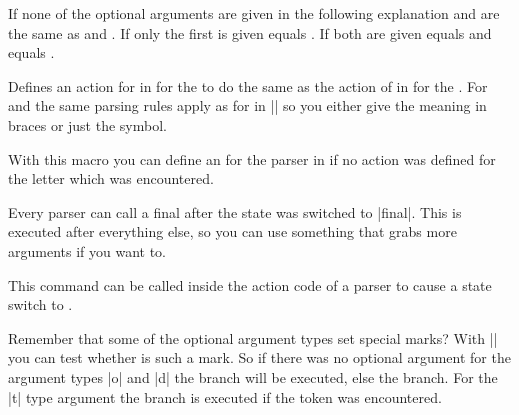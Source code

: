 \begin{command}%
  {%
    \pgfparserlet
  }%
  If none of the optional arguments are given in the following explanation
   and  are the same as
   and . If only the first is given
   equals . If both are given 
  equals  and  equals .

  Defines an action for  in  for the
   to do the same as the action of 
  in  for the . For 
  and  the same parsing rules apply as for  in |\pgfparserdef| so you either give the meaning in braces or just
  the symbol.
\end{command}%

\begin{command}{\pgfparserdefunknown{}}%
  With this macro you can define an  for the 
  parser in  if no action was defined for the letter which was
  encountered.
\end{command}%

\begin{command}{\pgfparserdeffinal{}}%
  Every parser can call a final  after the state was switched to
  |final|. This  is executed after everything else, so you can use
  something that grabs more arguments if you want to.
\end{command}%

\begin{command}{\pgfparserswitch{}}%
  This command can be called inside the action code of a parser to cause a
  state switch to .
\end{command}%

\begin{command}{\pgfparserifmark{}}%
  Remember that some of the optional argument types set special marks? With
  |\pgfparserifmark| you can test whether  is such a mark. So if
  there was no optional argument for the argument types |o| and |d| the
   branch will be executed, else the  branch. For the |t|
  type argument the  branch is executed if the token was encountered.
\end{command}%

